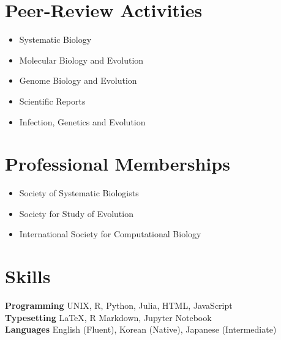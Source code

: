 \documentclass[11pt,letterpaper,sans]{moderncv} %
\begin{document}
\section{Peer-Review Activities}%
\begin{itemize}
	\item Systematic Biology
	\item Molecular Biology and Evolution
	\item Genome Biology and Evolution
	\item Scientific Reports
	\item Infection, Genetics and Evolution
\end{itemize}

\section{Professional Memberships}%
\begin{itemize}
	\item Society of Systematic Biologists
	\item Society for Study of Evolution
	\item International Society for Computational Biology
\end{itemize}

\section{Skills}%
\textbf{Programming} UNIX, R, Python, Julia, HTML, JavaScript\\
\textbf{Typesetting} {\LaTeX}, R Markdown, Jupyter Notebook\\
\textbf{Languages} English (Fluent), Korean (Native), Japanese (Intermediate)

\pagebreak
\end{document}
